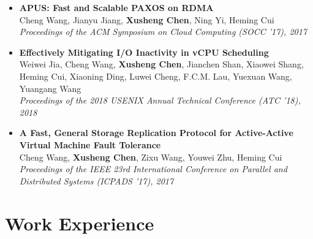 \documentclass[a4paper,8pt]{article} %
\begin{document}
\begin{itemize}
    \item \textbf{APUS: Fast and Scalable PAXOS on RDMA}\\
    Cheng Wang, Jianyu Jiang, \textbf{Xusheng Chen}, Ning Yi, Heming Cui\\
    \textit{Proceedings of the ACM Symposium on Cloud Computing (SOCC '17), 2017}\\

    \item \textbf{Effectively Mitigating I/O Inactivity in vCPU Scheduling} \\
    Weiwei Jia, Cheng Wang, \textbf{Xusheng Chen}, Jianchen Shan, Xiaowei Shang, Heming Cui, Xiaoning Ding, Luwei Cheng, F.C.M. Lau, Yuexuan Wang, Yuangang Wang \\
    \textit{Proceedings of the 2018 USENIX Annual Technical Conference (ATC '18), 2018} \\
    
    \item \textbf{A Fast, General Storage Replication Protocol for Active-Active Virtual Machine Fault Tolerance} \\
    Cheng Wang, \textbf{Xusheng Chen}, Zixu Wang, Youwei Zhu, Heming Cui\\
    \textit{Proceedings of the IEEE 23rd International Conference on Parallel and Distributed Systems (ICPADS '17), 2017}\\

\end{itemize}



\section{Work Experience}
\end{document}
